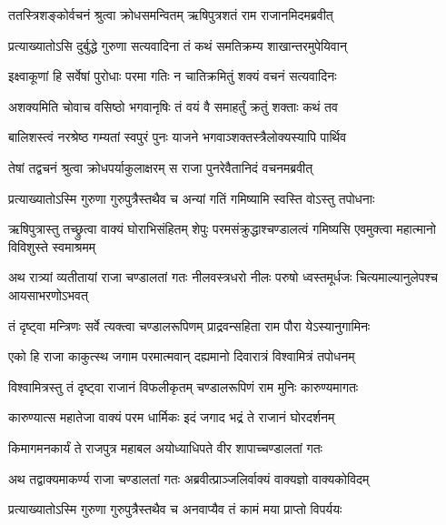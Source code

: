 
\twolineshloka
{ततस्त्रिशङ्कोर्वचनं श्रुत्वा क्रोधसमन्वितम्}
{ऋषिपुत्रशतं राम राजानमिदमब्रवीत्} %

\twolineshloka
{प्रत्याख्यातोऽसि दुर्बुद्धे गुरुणा सत्यवादिना}
{तं कथं समतिक्रम्य शाखान्तरमुपेयिवान्} %

\twolineshloka
{इक्ष्वाकूणां हि सर्वेषां पुरोधाः परमा गतिः}
{न चातिक्रमितुं शक्यं वचनं सत्यवादिनः} %

\twolineshloka
{अशक्यमिति चोवाच वसिष्ठो भगवानृषिः}
{तं वयं वै समाहर्तुं क्रतुं शक्ताः कथं तव} %

\twolineshloka
{बालिशस्त्वं नरश्रेष्ठ गम्यतां स्वपुरं पुनः}
{याजने भगवाञ्शक्तस्त्रैलोक्यस्यापि पार्थिव} %

\twolineshloka
{तेषां तद्वचनं श्रुत्वा क्रोधपर्याकुलाक्षरम्}
{स राजा पुनरेवैतानिदं वचनमब्रवीत्} %

\twolineshloka
{प्रत्याख्यातोऽस्मि गुरुणा गुरुपुत्रैस्तथैव च}
{अन्यां गतिं गमिष्यामि स्वस्ति वोऽस्तु तपोधनाः} %

\threelineshloka
{ऋषिपुत्रास्तु तच्छ्रुत्वा वाक्यं घोराभिसंहितम्}
{शेपुः परमसंक्रुद्धाश्चण्डालत्वं गमिष्यसि}
{एवमुक्त्वा महात्मानो विविशुस्ते स्वमाश्रमम्} %

\threelineshloka
{अथ रात्र्यां व्यतीतायां राजा चण्डालतां गतः}
{नीलवस्त्रधरो नीलः परुषो ध्वस्तमूर्धजः}
{चित्यमाल्यानुलेपश्च आयसाभरणोऽभवत्} %

\twolineshloka
{तं दृष्ट्वा मन्त्रिणः सर्वे त्यक्त्वा चण्डालरूपिणम्}
{प्राद्रवन्सहिता राम पौरा येऽस्यानुगामिनः} %

\twolineshloka
{एको हि राजा काकुत्स्थ जगाम परमात्मवान्}
{दह्यमानो दिवारात्रं विश्वामित्रं तपोधनम्} %

\twolineshloka
{विश्वामित्रस्तु तं दृष्ट्वा राजानं विफलीकृतम्}
{चण्डालरूपिणं राम मुनिः कारुण्यमागतः} %

\twolineshloka
{कारुण्यात्स महातेजा वाक्यं परम धार्मिकः}
{इदं जगाद भद्रं ते राजानं घोरदर्शनम्} %

\twolineshloka
{किमागमनकार्यं ते राजपुत्र महाबल}
{अयोध्याधिपते वीर शापाच्चण्डालतां गतः} %

\twolineshloka
{अथ तद्वाक्यमाकर्ण्य राजा चण्डालतां गतः}
{अब्रवीत्प्राञ्जलिर्वाक्यं वाक्यज्ञो वाक्यकोविदम्} %

\twolineshloka
{प्रत्याख्यातोऽस्मि गुरुणा गुरुपुत्रैस्तथैव च}
{अनवाप्यैव तं कामं मया प्राप्तो विपर्ययः} %

